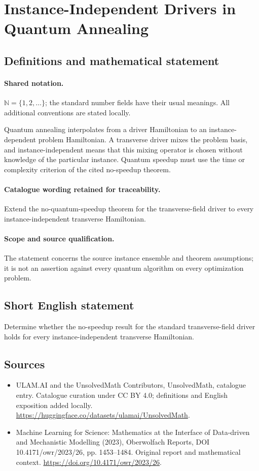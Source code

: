 \documentclass[11pt]{article}
\begin{document}
\section{Instance-Independent Drivers in Quantum Annealing}\label{statement}

\subsection{Definitions and mathematical statement}

\paragraph{Shared notation.}$\mathbb N=\{1,2,\ldots\}$; the standard number fields have their usual meanings. All additional conventions are stated locally.


Quantum annealing interpolates from a driver Hamiltonian to an instance-dependent problem Hamiltonian. A transverse driver mixes the problem basis, and instance-independent means that this mixing operator is chosen without knowledge of the particular instance. Quantum speedup must use the time or complexity criterion of the cited no-speedup theorem.

\paragraph{Catalogue wording retained for traceability.}
Extend the no-quantum-speedup theorem for the transverse-field driver to every instance-independent transverse Hamiltonian.

\paragraph{Scope and source qualification.}The statement concerns the source instance ensemble and theorem assumptions; it is not an assertion against every quantum algorithm on every optimization problem.
\subsection{Short English statement}
Determine whether the no-speedup result for the standard transverse-field driver holds for every instance-independent transverse Hamiltonian.
\subsection{Sources}
\begin{itemize}
\item[\hypertarget{source:statement:1}{S1}] ULAM.AI and the UnsolvedMath Contributors, UnsolvedMath, catalogue entry. Catalogue curation under CC BY 4.0; definitions and English exposition added locally.
\url{https://huggingface.co/datasets/ulamai/UnsolvedMath}.
\item[\hypertarget{source:statement:2}{S2}] Machine Learning for Science: Mathematics at the Interface of Data-driven and Mechanistic Modelling (2023), Oberwolfach Reports, DOI 10.4171/owr/2023/26, pp. 1453--1484. Original report and mathematical context.
\url{https://doi.org/10.4171/owr/2023/26}.
\end{itemize}
\label{end:statement}
\end{document}
